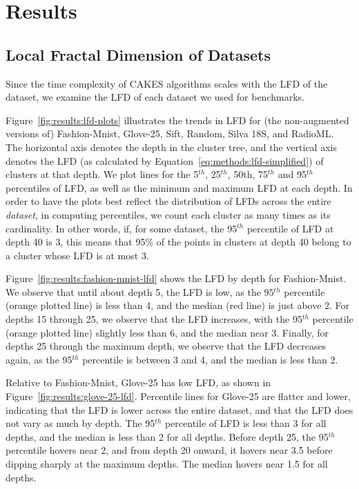 \section{Results}
\label{sec:results}


\subsection{Local Fractal Dimension of Datasets}
\label{sec:results:lfd-of-datasets}

Since the time complexity of CAKES algorithms scales with the LFD of the dataset, we examine the LFD of each dataset we used for benchmarks.

Figure~\ref{fig:results:lfd-plots} illustrates the trends in LFD for (the non-augmented versions of) Fashion-Mnist, Glove-25, Sift, Random, Silva 18S, and RadioML.
The horizontal axis denotes the depth in the cluster tree, and the vertical axis denotes the LFD (as calculated by Equation~\ref{eq:methods:lfd-simplified}) of clusters at that depth.
We plot lines for the 5$^{th}$, 25$^{th}$, 50th, 75$^{th}$ and 95$^{th}$ percentiles of LFD, as well as the minimum and maximum LFD at each depth.
In order to have the plots best reflect the distribution of LFDs across the entire \textit{dataset}, in computing percentiles, we count each cluster as many times as its cardinality.
In other words, if, for some dataset, the 95$^{th}$ percentile of LFD at depth 40 is 3, this means that 95\% of the points in clusters at depth 40 belong to a cluster whose LFD is at most 3.

Figure~\ref{fig:results:fashion-mnist-lfd} shows the LFD by depth for Fashion-Mnist.
We observe that until about depth 5, the LFD is low, as the 95$^{th}$ percentile (orange plotted line) is less than 4, and the median (red line) is just above 2.
For depths 15 through 25, we observe that the LFD increases, with the 95$^{th}$ percentile (orange plotted line) slightly less than 6, and the median near 3.
Finally, for depths 25 through the maximum depth, we observe that the LFD decreases again, as the 95$^{th}$ percentile is between 3 and 4, and the median is less than 2.

Relative to Fashion-Mnist, Glove-25 has low LFD, as shown in Figure~\ref{fig:results:glove-25-lfd}.
Percentile lines for Glove-25 are flatter and lower, indicating that the LFD is lower across the entire dataset, and that the LFD does not vary as much by depth.
The 95$^{th}$ percentile of LFD is less than 3 for all depths, and the median is less than 2 for all depths. 
Before depth 25, the 95$^{th}$ percentile hovers near 2, and from depth 20 onward, it hovers near 3.5 before dipping sharply at the maximum depths.
The median hovers near 1.5 for all depths.

